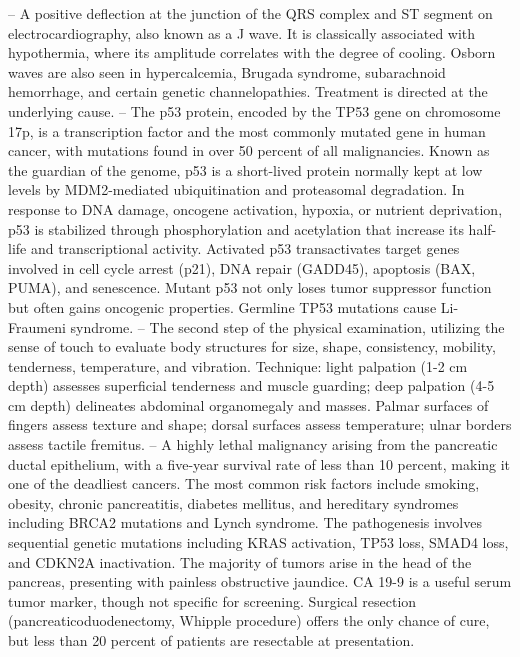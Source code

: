 -- A positive deflection at the junction of the QRS complex and ST segment on electrocardiography, also known as a J wave. It is classically associated with hypothermia, where its amplitude correlates with the degree of cooling. Osborn waves are also seen in hypercalcemia, Brugada syndrome, subarachnoid hemorrhage, and certain genetic channelopathies. Treatment is directed at the underlying cause.
-- The p53 protein, encoded by the TP53 gene on chromosome 17p, is a transcription factor and the most commonly mutated gene in human cancer, with mutations found in over 50 percent of all malignancies. Known as the guardian of the genome, p53 is a short-lived protein normally kept at low levels by MDM2-mediated ubiquitination and proteasomal degradation. In response to DNA damage, oncogene activation, hypoxia, or nutrient deprivation, p53 is stabilized through phosphorylation and acetylation that increase its half-life and transcriptional activity. Activated p53 transactivates target genes involved in cell cycle arrest (p21), DNA repair (GADD45), apoptosis (BAX, PUMA), and senescence. Mutant p53 not only loses tumor suppressor function but often gains oncogenic properties. Germline TP53 mutations cause Li-Fraumeni syndrome.
-- The second step of the physical examination, utilizing the sense of touch to evaluate body structures for size, shape, consistency, mobility, tenderness, temperature, and vibration. Technique: light palpation (1-2 cm depth) assesses superficial tenderness and muscle guarding; deep palpation (4-5 cm depth) delineates abdominal organomegaly and masses. Palmar surfaces of fingers assess texture and shape; dorsal surfaces assess temperature; ulnar borders assess tactile fremitus.
-- A highly lethal malignancy arising from the pancreatic ductal epithelium, with a five-year survival rate of less than 10 percent, making it one of the deadliest cancers. The most common risk factors include smoking, obesity, chronic pancreatitis, diabetes mellitus, and hereditary syndromes including BRCA2 mutations and Lynch syndrome. The pathogenesis involves sequential genetic mutations including KRAS activation, TP53 loss, SMAD4 loss, and CDKN2A inactivation. The majority of tumors arise in the head of the pancreas, presenting with painless obstructive jaundice. CA 19-9 is a useful serum tumor marker, though not specific for screening. Surgical resection (pancreaticoduodenectomy, Whipple procedure) offers the only chance of cure, but less than 20 percent of patients are resectable at presentation.
